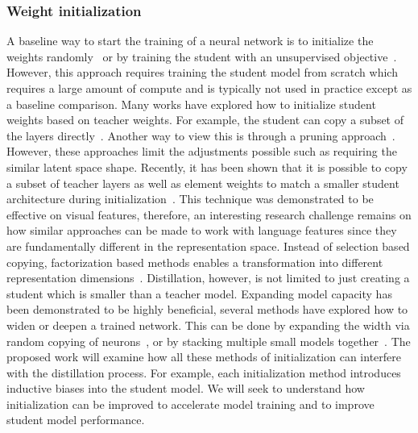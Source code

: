 \subsubsection{Weight initialization}
A baseline way to start the training of a neural network is to initialize the weights randomly~\cite{hinton2015distilling} or by training the student with an unsupervised objective~\cite{turc-etal-2020-well-read}.  However, this approach requires training the student model from scratch which requires a large amount of compute and is typically not used in practice except as a baseline comparison. Many works have explored how to initialize student weights based on teacher weights. For example, the student can copy a subset of the layers directly~\cite{wang-etal-2023-distill-bert, wang-etal-2023-distill-bert}. Another way to view this is through a pruning approach~\cite{xia-etal-2022-structured}. However, these approaches limit the adjustments possible such as requiring the similar latent space shape. Recently, it has been shown that it is possible to copy a subset of teacher layers as well as element weights to match a smaller student architecture during initialization~\cite{chen2024initializing}. This technique was demonstrated to be effective on visual features, therefore, an interesting research challenge remains on how similar approaches can be made to work with language features since they are fundamentally different in the representation space. Instead of selection based copying, factorization based methods enables a transformation into different representation dimensions~\cite{chen2021drone, ko2025efficient, yim2017gift, lee2018svd}. Distillation, however, is not limited to just creating a student which is smaller than a teacher model. Expanding model capacity has been demonstrated to be highly beneficial, several methods have explored how to widen or deepen a trained network. This can be done by expanding the width via random copying of neurons~\cite{chen2016net2net}, or by stacking multiple small models together~\cite{gong2019efficient}. The proposed work will examine how all these methods of initialization can interfere with the distillation process. For example, each initialization method introduces inductive biases into the student model. We will seek to understand how initialization can be improved to accelerate model training and to improve student model performance. 

